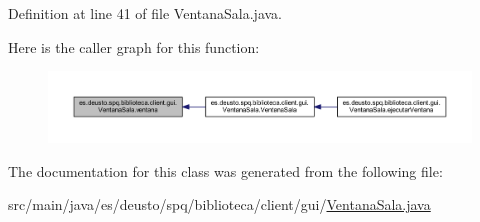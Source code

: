 Definition at line 41 of file Ventana\+Sala.\+java.

Here is the caller graph for this function\+:
\nopagebreak
\begin{figure}[H]
\begin{center}
\leavevmode
\includegraphics[width=350pt]{classes_1_1deusto_1_1spq_1_1biblioteca_1_1client_1_1gui_1_1_ventana_sala_adeb222b4e7905f68619c913a62814a8e_icgraph}
\end{center}
\end{figure}


The documentation for this class was generated from the following file\+:\begin{DoxyCompactItemize}
\item 
src/main/java/es/deusto/spq/biblioteca/client/gui/\mbox{\hyperlink{_ventana_sala_8java}{Ventana\+Sala.\+java}}\end{DoxyCompactItemize}
